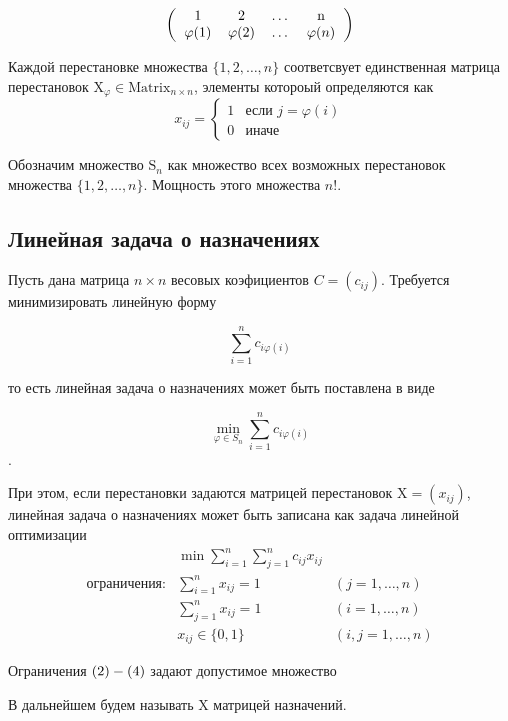 \[
\left (
  \begin{tabular}{cccc}
  1 & 2 & \ldots & n\\
  $\varphi (1)$ & $\varphi (2)$ & \ldots & $\varphi (n)$
  \end{tabular}
\right )
\]

Каждой перестановке множества $\{1, 2, \ldots , n \}$ соответсвует единственная матрица
перестановок $\mathrm{X}_\varphi \in \mathrm{Matrix}_{n \times n}$, элементы котороый определяются как
\[
x_{ij} =
 \begin{cases}
   1 & \text{если } j = \varphi(i) \\
   0 & \text{иначе}
 \end{cases}
\]

Обозначим множество $\mathrm{S}_n$ как множество всех возможных перестановок множества
 $\{1, 2, \ldots , n \}$. Мощность этого множества $n!$.

\subsection{Линейная задача о назначениях}
Пусть дана матрица $n \times n$ весовых коэфициентов $C = (c_{ij})$.
Требуется минимизировать линейную форму

\[
  \sum^n_{i = 1} c_{i \varphi (i)}
\]

то есть линейная задача о назначениях может быть поставлена в виде

\[
  \min_{\varphi \in S_n} \sum^n_{i = 1} c_{i \varphi (i)}
\].

При этом, если перестановки задаются матрицей перестановок $\mathrm{X} = (x_{ij})$,
линейная задача о назначениях может быть записана как задача линейной оптимизации
\begin{align}
  & \min \displaystyle \sum^n_{i = 1} \displaystyle \sum^n_{j = 1} c_{ij} x_{ij} \\
  \text{ограничения:} & \displaystyle \sum^n_{i = 1} x_{ij} = 1 &(j = 1, \ldots, n) \\
  &\displaystyle \sum^n_{j = 1} x_{ij} = 1 &(i = 1, \ldots, n) \\
  & x_{ij} \in \{ 0, 1 \}
  &(i,j = 1, \ldots, n)
\end{align}

Ограничения  $(2) \-- (4)$ задают допустимое множество

В дальнейшем будем называть $\mathrm{X}$ матрицей назначений.